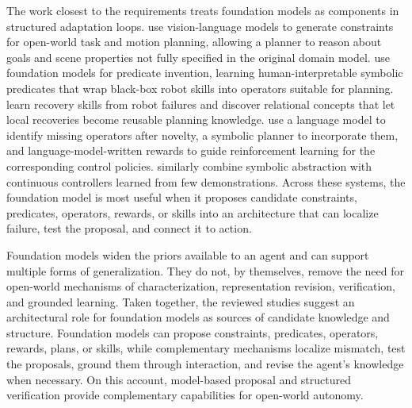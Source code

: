 The work closest to the requirements treats foundation models as components in structured adaptation loops.
\citet{kumar2026openworldtamp} use vision-language models to generate constraints for open-world task and motion planning, allowing a planner to reason about goals and scene properties not fully specified in the original domain model.
\citet{yang2025skillwrapper} use foundation models for predicate invention, learning human-interpretable symbolic predicates that wrap black-box robot skills into operators suitable for planning.
\citet{li2026recover} learn recovery skills from robot failures and discover relational concepts that let local recoveries become reusable planning knowledge.
\citet{lu2026novelty} use a language model to identify missing operators after novelty, a symbolic planner to incorporate them, and language-model-written rewards to guide reinforcement learning for the corresponding control policies.
\citet{lorang2025fewshot} similarly combine symbolic abstraction with continuous controllers learned from few demonstrations.
Across these systems, the foundation model is most useful when it proposes candidate constraints, predicates, operators, rewards, or skills into an architecture that can localize failure, test the proposal, and connect it to action.

Foundation models widen the priors available to an agent and can support multiple forms of generalization.
They do not, by themselves, remove the need for open-world mechanisms of characterization, representation revision, verification, and grounded learning.
Taken together, the reviewed studies suggest an architectural role for foundation models as sources of candidate knowledge and structure.
Foundation models can propose constraints, predicates, operators, rewards, plans, or skills, while complementary mechanisms localize mismatch, test the proposals, ground them through interaction, and revise the agent's knowledge when necessary.
On this account, model-based proposal and structured verification provide complementary capabilities for open-world autonomy.
